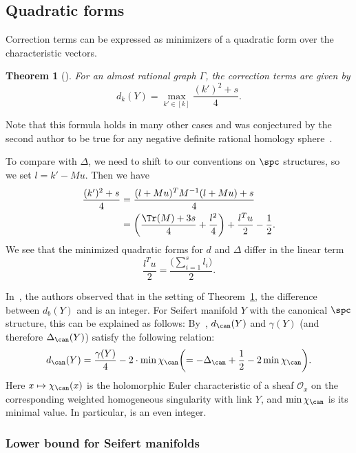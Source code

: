 \documentclass[pdftex]{sigma}
\newtheorem{Theorem}{Theorem}[section]
\begin{document}
\subsection{Quadratic forms}

Correction terms can be expressed as minimizers of a quadratic form over the characteristic vectors.

\begin{Theorem}[{\cite{Nem05}}]\label{thm:cor_terms} For an almost rational graph $\Gamma$, the correction terms are given by
 \[
 d_k(Y) = \max_{k' \in [k]} \frac{(k')^2+s}{4}.
 \]
\end{Theorem}
Note that this formula holds in many other cases and was conjectured by the second author to be true for any negative definite rational homology sphere~\cite{Nemethi_lattice08}.

To compare with $\Delta$, we need to shift to our conventions on $\spc$ structures, so we set $l = k' - Mu$. Then we have
 \begin{align*}
 \frac{(k')^2+s}{4} &= \frac{(l + Mu)^T M^{-1}(l + Mu) + s}{4}\\
 &= \biggl(\frac{\Tr(M) +3s}{4} + \frac{l^2}{4} \biggr) + \frac{l^T u}{2} - \frac12.
 \end{align*}
We see that the minimized quadratic forms for $d$ and $\Delta$ differ in the linear term
\[
\frac{l^T u}{2}= \frac{\bigl(\sum_{i=1}^s l_i\bigr)}{2}.
\]

\begin{Remark}
 In~\cite{GPP21}, the authors observed that in the setting of Theorem~\ref{thm:cor_terms}, the difference between $d_b(Y)$ and  is an integer. For Seifert manifold $Y$ with the canonical $\spc$ structure, this can be explained as follows:
 By~\cite[Section~11.7.2]{Nem22},
 $d_{\can}(Y)$ and $\gamma(Y)$ (and therefore $\Delta_{\can}(Y)$) satisfy the following relation:
 \begin{equation*}
 d_{\can}(Y)=\frac{\gamma(Y)}{4} - 2\cdot \min\chi_{\can} \biggl( = -\Delta_{\can} + \frac12 - 2 \min \chi_{\can} \biggr).
 \end{equation*}
 Here $x\mapsto \chi_{\can}(x)$ is the holomorphic Euler characteristic of a sheaf $\mathcal{O}_x$ on the corresponding weighted homogeneous singularity with link $Y$, and $\min\chi_{\can}$ is its minimal value. In particular,
  is an even integer.
\end{Remark}

\subsubsection{Lower bound for Seifert manifolds}
\end{document}
